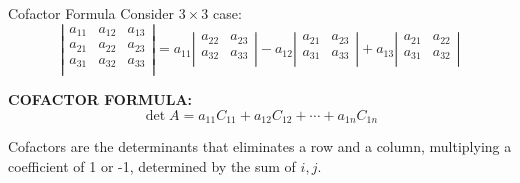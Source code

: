 \documentclass{beamer}
\begin{document}
\begin{frame}{Cofactor Formula}
Consider $3\times 3$ case:
\begin{equation*}
    \left| \begin{matrix}
        a_{11}&		a_{12}&		a_{13}\\
        a_{21}&		a_{22}&		a_{23}\\
        a_{31}&		a_{32}&		a_{33}\\
    \end{matrix} \right|=a_{11}\left| \begin{matrix}
        a_{22}&		a_{23}\\
        a_{32}&		a_{33}\\
    \end{matrix} \right|-a_{12}\left| \begin{matrix}
        a_{21}&		a_{23}\\
        a_{31}&		a_{33}\\
    \end{matrix} \right|+a_{13}\left| \begin{matrix}
        a_{21}&		a_{22}\\
        a_{31}&		a_{32}\\
    \end{matrix} \right|
\end{equation*}

\textbf{COFACTOR FORMULA:}
\begin{equation*}
    \det A=a_{11}C_{11}+a_{12}C_{12}+\cdots +a_{1n}C_{1n}
\end{equation*}

Cofactors are the determinants that eliminates a row and a column, multiplying a coefficient of 1 or -1, determined by the sum of $i, j$.
\end{frame}
\end{document}
